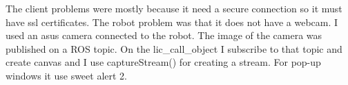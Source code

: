 \begin{itemize}
\end{itemize}




The client problems were mostly because it need a secure connection so it must have ssl certificates. The robot problem was that it does not have a webcam.
I used an asus camera connected to the robot. The image of the camera was published on a ROS topic. On the lic_call_object I subscribe to that topic
and  create canvas and I use captureStream() for creating a stream.
For pop-up windows it use sweet alert 2.


